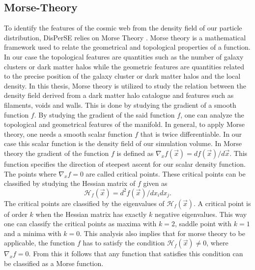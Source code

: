\subsection{Morse-Theory}
To identify the features of the cosmic web from the density field of our
particle distribution, DisPerSE relies on Morse Theory \cite{Morse}. Morse
theory is a mathematical framework used to relate the geometrical and
topological properties of a function. In our case the topological features are quantities such as the number of galaxy clusters or dark matter halos while the geometric features are quantities related to the precise position of the galaxy cluster or dark matter halos and the local density. In this thesis, Morse theory is utilized to
study the relation between the density field derived from a dark matter halo catalogue and features such as
filaments, voids and walls.
This is done by studying the gradient of a smooth function $f$. By studying the
gradient of the said function $f$, one can analyze the topological and geometrical features of
the manifold. In general, to apply Morse theory, one needs a smooth scalar function $f$
that is twice differentiable. In our case this scalar function is the density
field of our simulation volume. In Morse theory the gradient of the function $f$
is defined as $\nabla_xf(\vec{x})=df(\vec{x})/d\vec{x}$. This function
specifies the direction of steepest ascent for our scalar density function. The
points where $\nabla_xf=0$ are called critical points. These critical
points can be classified by studying the Hessian matrix of $f$ given as
\begin{equation}
    \mathcal{H}_f(\vec{x})=d^2f(\vec{x})/dx_idx_j.
\end{equation}
The critical points are classified by the eigenvalues of $\mathcal{H}_f(\vec{x})$. A critical point is of order $k$ when the Hessian matrix has exactly $k$
negative eigenvalues. This way one can classify the critical points as maxima
with $k=2$, saddle point with $k=1$ and a minima with $k=0$. This analysis also
implies that for morse theory to be applicable, the function $f$ has to satisfy
the condition $\mathcal{H}_f(\vec{x})\neq 0$, where $\nabla_xf=0$. From this it
follows that any function that satisfies this condition can be classified as a Morse
function.\\
 
